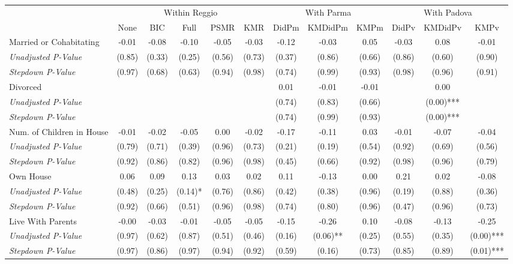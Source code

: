 \begin{tabular}{l c c c c c c c c c c c}
\toprule
& \multicolumn{5}{c}{Within Reggio} & \multicolumn{3}{c}{With Parma} & \multicolumn{3}{c}{With Padova} \\\cmidrule(lr){2-6} \cmidrule(lr){7-9} \cmidrule(lr){10-12}
 & None & BIC & Full & PSMR & KMR & DidPm & KMDidPm & KMPm & DidPv & KMDidPv & KMPv \\
\midrule
Married or Cohabitating & -0.01 & -0.08 & -0.10 & -0.05 & -0.03 & -0.12 & -0.03 & 0.05 & -0.03 & 0.08 & -0.01 \\
\quad \textit{Unadjusted P-Value} & (0.85) & (0.33) & (0.25) & (0.56) & (0.73) & (0.37) & (0.86) & (0.66) & (0.86) & (0.60) & (0.90) \\
\quad \textit{Stepdown P-Value} & (0.97) & (0.68) & (0.63) & (0.94) & (0.98) & (0.74) & (0.99) & (0.93) & (0.98) & (0.96) & (0.91) \\
Divorced &  &  &  &  &  & 0.01 & -0.01 & -0.01 &  & 0.00 &  \\
\quad \textit{Unadjusted P-Value} & & & & & & (0.74) & (0.83) & (0.66) & & (0.00)*** & \\
\quad \textit{Stepdown P-Value} &  &  &  & & & (0.74) & (0.99) & (0.93) &  & (0.00)*** &  \\
Num. of Children in House & -0.01 & -0.02 & -0.05 & 0.00 & -0.02 & -0.17 & -0.11 & 0.03 & -0.01 & -0.07 & -0.04 \\
\quad \textit{Unadjusted P-Value} & (0.79) & (0.71) & (0.39) & (0.96) & (0.73) & (0.21) & (0.19) & (0.54) & (0.92) & (0.69) & (0.56) \\
\quad \textit{Stepdown P-Value} & (0.92) & (0.86) & (0.82) & (0.96) & (0.98) & (0.45) & (0.66) & (0.92) & (0.98) & (0.96) & (0.79) \\
Own House & 0.06 & 0.09 & 0.13 & 0.03 & 0.02 & 0.11 & -0.13 & 0.00 & 0.21 & 0.02 & -0.08 \\
\quad \textit{Unadjusted P-Value} & (0.48) & (0.25) & (0.14)* & (0.76) & (0.86) & (0.42) & (0.38) & (0.96) & (0.19) & (0.88) & (0.36) \\
\quad \textit{Stepdown P-Value} & (0.92) & (0.66) & (0.51) & (0.96) & (0.98) & (0.74) & (0.80) & (0.96) & (0.47) & (0.96) & (0.73) \\
Live With Parents & -0.00 & -0.03 & -0.01 & -0.05 & -0.05 & -0.15 & -0.26 & 0.10 & -0.08 & -0.13 & -0.25 \\
\quad \textit{Unadjusted P-Value} & (0.97) & (0.62) & (0.87) & (0.51) & (0.46) & (0.16) & (0.06)** & (0.25) & (0.55) & (0.35) & (0.00)*** \\
\quad \textit{Stepdown P-Value} & (0.97) & (0.86) & (0.97) & (0.94) & (0.92) & (0.59) & (0.16) & (0.73) & (0.85) & (0.89) & (0.01)*** \\
\bottomrule
\end{tabular}
